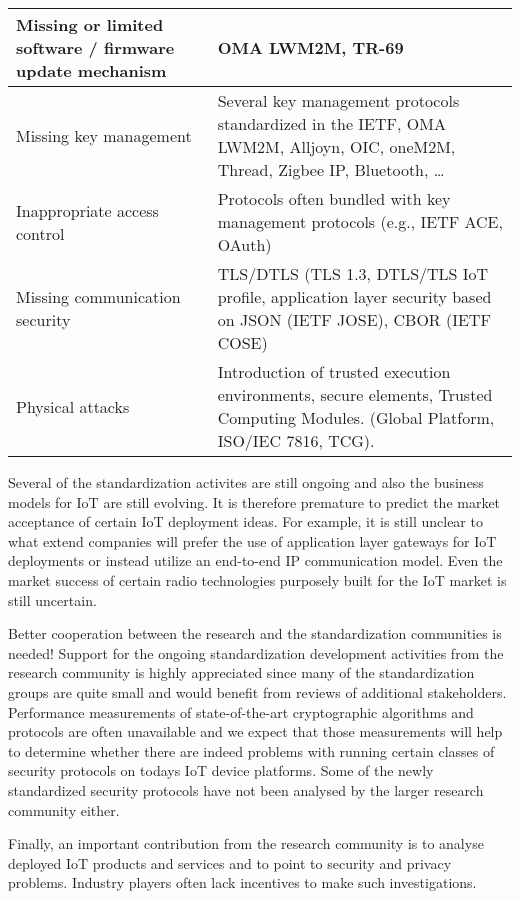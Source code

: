 \documentclass[peerreview, a4paper, draft, 7pt]{IEEEtran}
\begin{document}
\begin{center}
  \begin{tabular}{ | p{5cm} | p{7cm} | }
    \hline
Missing or limited software / firmware update mechanism & OMA LWM2M, TR-69 \\ \hline
Missing key management & Several key management protocols standardized in the IETF, OMA LWM2M, Alljoyn, OIC, oneM2M, Thread, Zigbee IP, Bluetooth, …
 \\ \hline \hline
Inappropriate access control & Protocols often bundled with key management protocols (e.g., IETF ACE, OAuth) \\
Missing communication security & TLS/DTLS (TLS 1.3, DTLS/TLS IoT profile, application layer security based on JSON (IETF JOSE), CBOR (IETF COSE) \\
Physical attacks & Introduction of trusted execution environments, secure elements, Trusted Computing Modules. (Global Platform, ISO/IEC 7816, TCG).\\
    \hline
  \end{tabular}
\end{center}  

Several of the standardization activites are still ongoing and also the business models for IoT are still evolving. It is therefore premature to predict the market acceptance of certain IoT deployment ideas. For example, it is still unclear to what extend companies will prefer the use of application layer gateways for IoT deployments or instead utilize an end-to-end IP communication model. Even the market success of certain radio technologies purposely built for the IoT market is still uncertain.  

Better cooperation between the research and the standardization communities is needed! Support for the ongoing standardization development activities from the research community is highly appreciated since many of the standardization groups are quite small and would benefit from reviews of additional stakeholders. Performance measurements of state-of-the-art cryptographic algorithms and protocols are often unavailable and we expect that those measurements will help to determine whether there are indeed problems with running certain classes of security protocols on todays IoT device platforms. Some of the newly standardized security protocols have not been analysed by the larger research community either. 

Finally, an important contribution from the research community is to analyse deployed IoT products and services and to point to security and privacy problems. Industry players often lack incentives to make such investigations. 


% 

\end{document}
